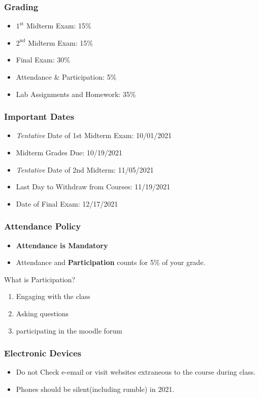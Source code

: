 \documentclass[17pt]{beamer}
\begin{document}
\begin{frame}
	\frametitle{Grading}
		\begin{itemize}
			\item $1^\text{st}$ Midterm Exam: 15\%
			\item $2^\text{nd}$ Midterm Exam: 15\%
			\item Final Exam: 30\%
			\item Attendance \& Participation: 5\% 
			\item Lab Assignments and Homework: 35\%
		\end{itemize}
\end{frame}
\begin{frame}
	\frametitle{Important Dates}
	\begin{itemize}
		\item \textit{Tentative} Date of 1st Midterm Exam: 10/01/2021 
		\item Midterm Grades Due: 10/19/2021
		\item \textit{Tentative} Date of 2nd Midterm: 11/05/2021 
		\item Last Day to Withdraw from Courses: 11/19/2021
		\item Date of Final Exam: 12/17/2021
	\end{itemize}
\end{frame}
\begin{frame}
	\frametitle{Attendance Policy}
	\begin{itemize}
		\item \textbf{Attendance is Mandatory}
		\item Attendance and \textbf{Participation} counts for 5\% of your grade.
	\end{itemize}
What is Participation?
\begin{enumerate}
	\item Engaging with the class
	\item Asking questions
	\item participating in the moodle forum
\end{enumerate}
\end{frame}
\begin{frame}
	\frametitle{Electronic Devices}
	\begin{itemize}
		\item Do not Check e-email or visit websites extraneous to the course during class.
		\item Phones should be silent(including rumble) in 2021. 
	\end{itemize}
\end{frame}
\end{document}
